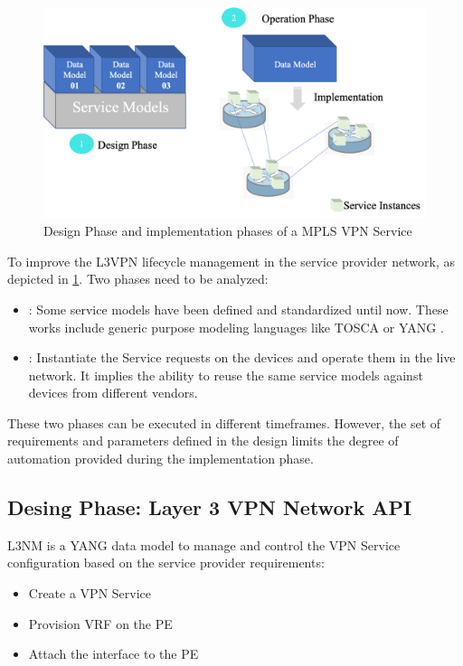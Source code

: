 \documentclass[conference]{IEEEtran}
\begin{document}
\begin{figure}
	\centering
		\includegraphics[scale=0.3]{figure2png.png}
	\caption{Design Phase and implementation phases of a MPLS VPN Service}
	\label{FIG:2}
\end{figure}

To improve the L3VPN lifecycle management in the service provider network, as depicted in \ref{FIG:2}. Two phases need to be analyzed:
\begin{itemize}
    \item {}: Some service models have been defined and standardized until now. These works include generic purpose modeling languages like TOSCA or YANG \cite{}.
    \item {}: Instantiate the Service requests on the devices and operate them in the live network. It implies the ability to reuse the same service models against devices from different vendors.
\end{itemize}

These two phases can be executed in different timeframes. However, the set of requirements and parameters defined in the design limits the degree of automation provided during the implementation phase. 

\subsection{Desing Phase: Layer 3 VPN Network API}

L3NM \cite{Aguado:2019aa} is a YANG data model to manage and control the VPN Service configuration based on the service provider requirements:
\begin{itemize}
    \item Create a VPN Service
    \item Provision VRF on the PE
    \item  Attach the interface to the PE
\end{itemize}
\end{document}

